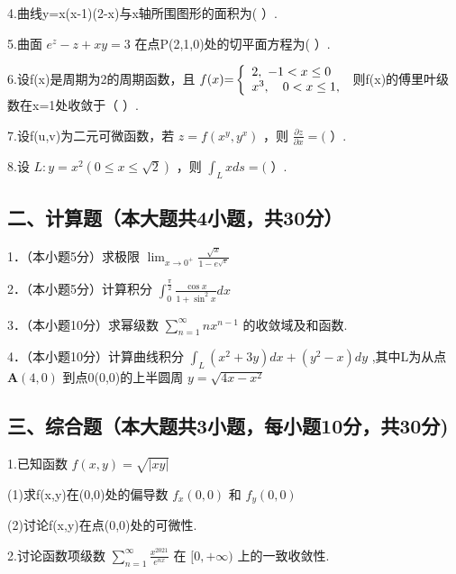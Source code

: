 \documentclass[11pt,fontset=fandol]{ctexart}
\begin{document}
4.曲线y=x(x-1)(2-x)与x轴所围图形的面积为( ）.

5.曲面 \(e ^ { z } - z + x y = 3\) 在点P(2,1,0)处的切平面方程为( ）.

6.设f(x)是周期为2的周期函数，且
\(f ( x ) { = } \left\{ \begin{array} { l l } { { 2 } , \ { - } 1 < x \le 0 } \\ { { x } ^ { 3 } , \quad 0 < x \le 1 , } \end{array} \right.\)
则f(x)的傅里叶级数在x=1处收敛于（ ）.

7.设f(u,v)为二元可微函数，若 \(z = f ( x ^ { y } , y ^ { x } )\) ，则
\(\frac { \partial z } { \partial x } = (\) ）.

8.设 \(L : y = x ^ { 2 } ( 0 \leq x \leq { \sqrt { 2 } } )\) ，则
\(\int _ { L } x d s = (\) ）.

\subsection{二、计算题（本大题共4小题，共30分）}\label{ux4e8cux8ba1ux7b97ux9898ux672cux5927ux9898ux51714ux5c0fux9898ux517130ux5206}

1．（本小题5分）求极限
\(\lim _ { x \to 0 ^ { + } } { \frac { \sqrt { x } } { 1 - e ^ { \sqrt { x } } } }\)

2．（本小题5分）计算积分
\(\int _ { 0 } ^ { \frac { \pi } { 2 } } { \frac { \cos x } { 1 + \sin ^ { 2 } x } } d x\)

3．（本小题10分）求幂级数
\(\sum _ { n = 1 } ^ { \infty } n x ^ { n - 1 }\) 的收敛域及和函数.

4．（本小题10分）计算曲线积分
\(\int _ { L } ( x ^ { 2 } + 3 y ) d x + ( y ^ { 2 } - x ) d y\)
,其中L为从点 \(\pmb { A } ( 4 , 0 )\) 到点0(0,0)的上半圆周
\(y = \sqrt { 4 x - x ^ { 2 } }\)

\subsection{三、综合题（本大题共3小题，每小题10分，共30分)}\label{ux4e09ux7efcux5408ux9898ux672cux5927ux9898ux51713ux5c0fux9898ux6bcfux5c0fux989810ux5206ux517130ux5206}

1.已知函数 \(f ( x , y ) = { \sqrt { | x y | } }\)

(1)求f(x,y)在(0,0)处的偏导数 \(f _ { x } ( 0 , 0 )\) 和
\({ f _ { y } } ( 0 , 0 )\)

(2)讨论f(x,y)在点(0,0)处的可微性.

2.讨论函数项级数
\(\sum _ { n = 1 } ^ { \infty } { \frac { x ^ { 2 0 2 1 } } { e ^ { n x } } }\)
在 \([ 0 , + \infty )\) 上的一致收敛性.
\end{document}
